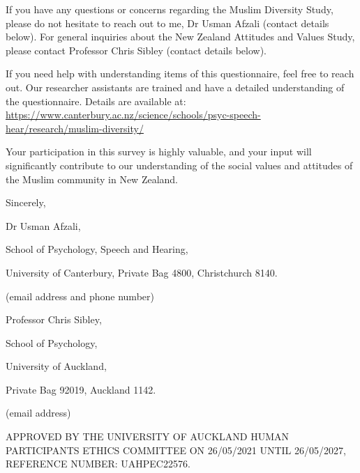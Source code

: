 \documentclass[
]{interact}
\begin{document}
\noindent If you have any questions or concerns regarding the Muslim
Diversity Study, please do not hesitate to reach out to me, Dr Usman
Afzali (contact details below). For general inquiries about the New
Zealand Attitudes and Values Study, please contact Professor Chris
Sibley (contact details below).

\noindent If you need help with understanding items of this
questionnaire, feel free to reach out. Our researcher assistants are
trained and have a detailed understanding of the questionnaire. Details
are available at:
\url{https://www.canterbury.ac.nz/science/schools/psyc-speech-hear/research/muslim-diversity/}

\noindent Your participation in this survey is highly valuable, and your
input will significantly contribute to our understanding of the social
values and attitudes of the Muslim community in New Zealand.

\noindent Sincerely,

Dr Usman Afzali,

School of Psychology, Speech and Hearing,

University of Canterbury, Private Bag 4800, Christchurch 8140.

(email address and phone number)

Professor Chris Sibley,

School of Psychology,

University of Auckland,

Private Bag 92019, Auckland 1142.

(email address)

\noindent APPROVED BY THE UNIVERSITY OF AUCKLAND HUMAN PARTICIPANTS
ETHICS COMMITTEE ON 26/05/2021 UNTIL 26/05/2027, REFERENCE NUMBER:
UAHPEC22576.
\end{document}
